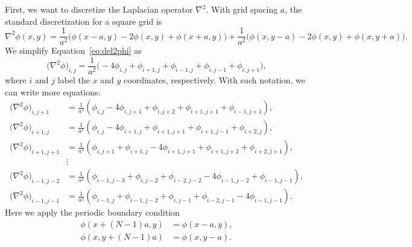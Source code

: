 \Answer{}
First, we want to discretize the Laplacian operator \(\nabla^2\).
With grid spacing \(a\), the standard discretization for a square grid is
%
\begin{equation}\label{eq:del2phi}
    \nabla^2 \phi(x, y) =
    \frac{ 1 }{ a^2 } \bigl(\phi(x - a, y) - 2 \phi(x, y) + \phi(x + a, y)\bigr) +
    \frac{ 1 }{ a^2 } \bigl(\phi(x, y - a) - 2 \phi(x, y) + \phi(x, y + a)\bigr).
\end{equation}
%
We simplify Equation~\eqref{eq:del2phi} as
%
\begin{equation}
    \bigl(\nabla^2 \phi\bigr)_{i, j} = \frac{1}{a^2} \bigl(
    -4 \phi_{i, j} + \phi_{i+1, j} + \phi_{i-1, j} + \phi_{i, j-1} + \phi_{i, j+1}
    \bigr),
\end{equation}
%
where \(i\) and \(j\) label the \(x\) and \(y\) coordinates, respectively.
With such notation, we can write more equations:
%
\begin{align}
    \bigl(\nabla^2 \phi\bigr)_{i, j+1}   & = \frac{1}{a^2} (
    \phi_{i, j} - 4\phi_{i, j+1} + \phi_{i, j+2} + \phi_{i+1, j+1} + \phi_{i-1, j+1}
    ),                                                       \\
    \bigl(\nabla^2 \phi\bigr)_{i+1, j}   & = \frac{1}{a^2} (
    \phi_{i, j} - 4\phi_{i+1, j} + \phi_{i+1, j+1} + \phi_{i+1, j-1} + \phi_{i+2, j}
    ),                                                       \\
    \bigl(\nabla^2 \phi\bigr)_{i+1, j+1} & = \frac{1}{a^2} (
    \phi_{i, j+1} + \phi_{i+1, j} - 4\phi_{i+1, j+1} + \phi_{i+1, j+2} + \phi_{i+2, j+1}
    ),                                                       \\
                                         & \vdots            \\
    \bigl(\nabla^2 \phi\bigr)_{i-1, j-2} & = \frac{1}{a^2} (
    \phi_{i-1, j-3} + \phi_{i, j-2} + \phi_{i-2, j-2} - 4\phi_{i-1, j-2} + \phi_{i-1, j-1}
    ),                                                       \\
    \bigl(\nabla^2 \phi\bigr)_{i-1, j-1} & = \frac{1}{a^2} (
    \phi_{i-1, j} + \phi_{i-1, j-2} + \phi_{i, j-1} + \phi_{i-2, j-1} - 4\phi_{i-1, j-1}
    ).
\end{align}
%
Here we apply the periodic boundary condition
%
\begin{align}
    \phi(x + (N-1)a, y) & = \phi(x - a, y), \\
    \phi(x, y + (N-1)a) & = \phi(x, y - a).
\end{align}

